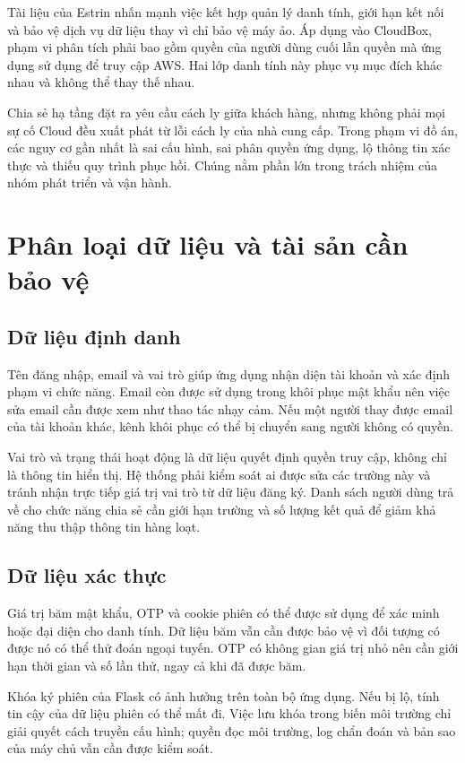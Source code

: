 Tài liệu của Estrin nhấn mạnh việc kết hợp quản lý danh tính, giới hạn kết nối và bảo vệ dịch vụ dữ liệu thay vì chỉ bảo vệ máy ảo. Áp dụng vào CloudBox, phạm vi phân tích phải bao gồm quyền của người dùng cuối lẫn quyền mà ứng dụng sử dụng để truy cập AWS. Hai lớp danh tính này phục vụ mục đích khác nhau và không thể thay thế nhau.\cite{estrin}

Chia sẻ hạ tầng đặt ra yêu cầu cách ly giữa khách hàng, nhưng không phải mọi sự cố Cloud đều xuất phát từ lỗi cách ly của nhà cung cấp. Trong phạm vi đồ án, các nguy cơ gần nhất là sai cấu hình, sai phân quyền ứng dụng, lộ thông tin xác thực và thiếu quy trình phục hồi. Chúng nằm phần lớn trong trách nhiệm của nhóm phát triển và vận hành.

\section{Phân loại dữ liệu và tài sản cần bảo vệ}
\subsection{Dữ liệu định danh}
Tên đăng nhập, email và vai trò giúp ứng dụng nhận diện tài khoản và xác định phạm vi chức năng. Email còn được sử dụng trong khôi phục mật khẩu nên việc sửa email cần được xem như thao tác nhạy cảm. Nếu một người thay được email của tài khoản khác, kênh khôi phục có thể bị chuyển sang người không có quyền.

Vai trò và trạng thái hoạt động là dữ liệu quyết định quyền truy cập, không chỉ là thông tin hiển thị. Hệ thống phải kiểm soát ai được sửa các trường này và tránh nhận trực tiếp giá trị vai trò từ dữ liệu đăng ký. Danh sách người dùng trả về cho chức năng chia sẻ cần giới hạn trường và số lượng kết quả để giảm khả năng thu thập thông tin hàng loạt.
\subsection{Dữ liệu xác thực}
Giá trị băm mật khẩu, OTP và cookie phiên có thể được sử dụng để xác minh hoặc đại diện cho danh tính. Dữ liệu băm vẫn cần được bảo vệ vì đối tượng có được nó có thể thử đoán ngoại tuyến. OTP có không gian giá trị nhỏ nên cần giới hạn thời gian và số lần thử, ngay cả khi đã được băm.

Khóa ký phiên của Flask có ảnh hưởng trên toàn bộ ứng dụng. Nếu bị lộ, tính tin cậy của dữ liệu phiên có thể mất đi. Việc lưu khóa trong biến môi trường chỉ giải quyết cách truyền cấu hình; quyền đọc môi trường, log chẩn đoán và bản sao của máy chủ vẫn cần được kiểm soát.
